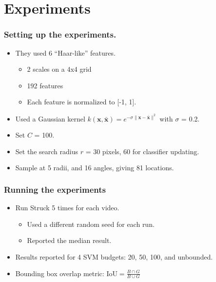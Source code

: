 \section{Experiments}

\begin{frame}
    \frametitle{Setting up the experiments.}
    \begin{itemize}
        \item They used 6 ``Haar-like'' features.
            \begin{itemize}
                \item 2 scales on a 4x4 grid
                \item 192 features
                \item Each feature is normalized to [-1, 1].
            \end{itemize}
        \item Used a Gaussian kernel \( k(\mathbf{x}, \mathbf{\bar{x}}) = e^{-\sigma\|\mathbf{x} -
            \mathbf{\bar{x}}\|^2} \) with \(\sigma\) = 0.2.
        \item Set \(C\) = 100.
        \item Set the search radius \(r\) = 30 pixels, 60 for classifier updating.
        \item Sample at 5 radii, and 16 angles, giving 81 locations.
    \end{itemize}
\end{frame}


\begin{frame}
    \frametitle{Running the experiments}
    \begin{itemize}
        \item Run Struck 5 times for each video.
            \begin{itemize}
                \item Used a different random seed for each run.
                \item Reported the median result.
            \end{itemize}
        \item Results reported for 4 SVM budgets: 20, 50, 100, and unbounded.
        \item Bounding box overlap metric: \(\text{IoU} = \frac{B \cap G}{B \cup G}\)
    \end{itemize}
\end{frame}

